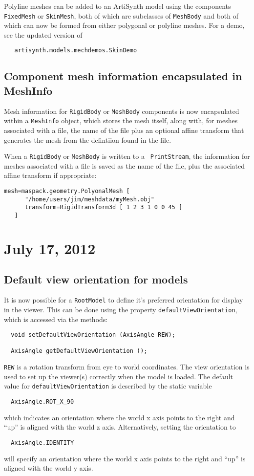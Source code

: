 \documentclass{article}
\begin{document}
Polyline meshes can be added to an ArtiSynth model using the
components {\tt FixedMesh} or {\tt SkinMesh}, both of which are
subclasses of {\tt MeshBody} and both of which can now be formed from
either polygonal or polyline meshes.  For a demo, see the updated
version of
\begin{verbatim}
   artisynth.models.mechdemos.SkinDemo
\end{verbatim}

\subsection*{Component mesh information encapsulated in MeshInfo}

Mesh information for {\tt RigidBody} or {\tt MeshBody} components is
now encapsulated within a {\tt MeshInfo} object, which stores the mesh
itself, along with, for meshes associated with a file, the name of the
file plus an optional affine transform that generates the mesh from
the defintiion found in the file.

When a {\tt RigidBody} or {\tt MeshBody} is written to a {\tt
PrintStream}, the information for meshes associated with a file is
saved as the name of the file, plus the associated affine transform if
appropriate:
\begin{lstlisting}[]
   mesh=maspack.geometry.PolyonalMesh [
      "/home/users/jim/meshdata/myMesh.obj"
      transform=RigidTransform3d [ 1 2 3 1 0 0 45 ]
   ]
\end{lstlisting}

\section*{July 17, 2012}

\subsection*{Default view orientation for models}

It is now possible for a {\tt RootModel} to define it's preferred
orientation for display in the viewer. This can be done using the
property {\tt defaultViewOrientation}, which is accessed
via the methods:
\begin{verbatim}
  void setDefaultViewOrientation (AxisAngle REW);

  AxisAngle getDefaultViewOrientation ();
\end{verbatim}
{\tt REW} is a rotation transform from eye to world coordinates.  The
view orientation is used to set up the viewer(s) correctly when the
model is loaded. The default value for {\tt defaultViewOrientation} is
described by the static variable
\begin{verbatim}
  AxisAngle.ROT_X_90
\end{verbatim}
which indicates an orientation where the world x axis points to the 
right and ``up'' is aligned with the world z axis. Alternatively,
setting the orientation to 
\begin{verbatim}
  AxisAngle.IDENTITY
\end{verbatim}
will specify an orientation where the world x axis points to the
right and ``up'' is aligned with the world y axis.
\end{document}
